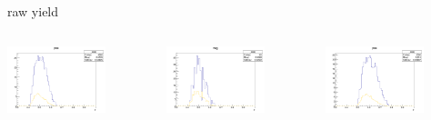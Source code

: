 \begin{frame}{raw yield}
\begin{columns}
\begin{column}[T]{0.25\textwidth}
\includegraphics[width = 0.7\textwidth]{results/yield/statistics/yield_x_Q2_z_0.40_4.000_0.50_pos.png}
\end{column}
\begin{column}[T]{0.25\textwidth}
\includegraphics[width = 0.7\textwidth]{results/yield/statistics/yield_x_Q2_z_0.40_4.000_0.50_neg.png}
\end{column}
\begin{column}[T]{0.25\textwidth}
\includegraphics[width = 0.7\textwidth]{results/yield/statistics/yield_x_Q2_z_0.40_4.000_0.60_pos.png}

\end{column}
\end{columns}
\end{frame}
